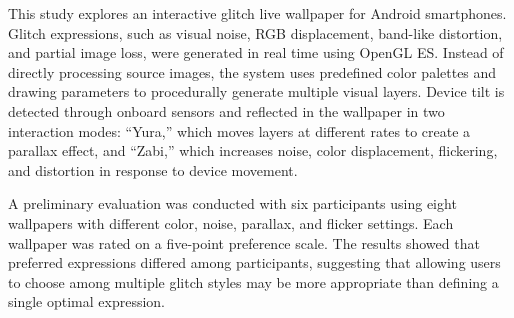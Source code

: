 This study explores an interactive glitch live wallpaper for Android smartphones. Glitch expressions, such as visual noise, RGB displacement, band-like distortion, and partial image loss, were generated in real time using OpenGL ES. Instead of directly processing source images, the system uses predefined color palettes and drawing parameters to procedurally generate multiple visual layers. Device tilt is detected through onboard sensors and reflected in the wallpaper in two interaction modes: “Yura,” which moves layers at different rates to create a parallax effect, and “Zabi,” which increases noise, color displacement, flickering, and distortion in response to device movement.

A preliminary evaluation was conducted with six participants using eight wallpapers with different color, noise, parallax, and flicker settings. Each wallpaper was rated on a five-point preference scale. The results showed that preferred expressions differed among participants, suggesting that allowing users to choose among multiple glitch styles may be more appropriate than defining a single optimal expression.
